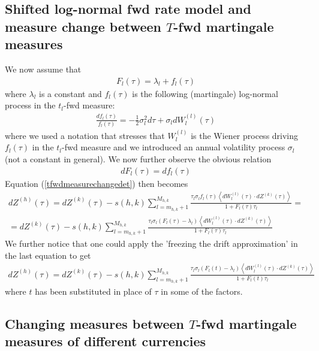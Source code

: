 \documentclass[a4paper,10pt]{report}
\theoremstyle{plain}
\theoremstyle{definition}
\newcommand\be{\begin{eqnarray}}    %
\newcommand\ee{\end{eqnarray}}
\begin{document}
\subsection{Shifted log-normal fwd rate model and measure change between $T$-fwd martingale measures}

We now assume that
\be 
F_l(\tau) = \lambda_l + f_l(\tau)
\ee
where $\lambda_l$ is a constant and $f_l(\tau)$ is the following (martingale) log-normal process in the $t_l$-fwd measure:
\be 
\frac{d f_l(\tau)}{f_l(\tau)} = -\frac{1}{2}\sigma_l^2 d\tau + \sigma_l dW_l^{(l)}(\tau)
\ee
where we used a notation that stresses that $W_l^{(l)}$ is the Wiener process driving $f_l(\tau)$ in the $t_l$-fwd measure and we introduced an annual volatility process $\sigma_l$ (not a constant in general).
We now further observe the obvious relation 
\be 
d F_l(\tau) = d f_l(\tau)
\ee
Equation (\ref{tfwdmeasurechangedet}) then becomes
\be 
dZ^{(h)}(\tau) = dZ^{(k)}(\tau)- s(h,k) \sum_{l=m_{h,k}+1}^{M_{h,k}} \frac{\tau_l \sigma_l f_l(\tau) \left<d W_l^{(l)}(\tau)\cdot dZ^{(k)}(\tau)\right>}{1 + F_l(\tau)\tau_l } =\\
= dZ^{(k)}(\tau)- s(h,k) \sum_{l=m_{h,k}+1}^{M_{h,k}} \frac{\tau_l \sigma_l (F_l(\tau)-\lambda_l) \left<d W_l^{(l)}(\tau)\cdot dZ^{(k)}(\tau)\right>}{1 + F_l(\tau)\tau_l }
\label{shifttfwdmeasurechange}
\ee
We further notice that one could apply the 'freezing the drift approximation' in the last equation to get
\be 
dZ^{(h)}(\tau) =dZ^{(k)}(\tau)- s(h,k) \sum_{l=m_{h,k}+1}^{M_{h,k}} \frac{\tau_l \sigma_l (F_l(t)-\lambda_l) \left<d W_l^{(l)}(\tau)\cdot dZ^{(k)}(\tau)\right>}{1 + F_l(t)\tau_l }
\ee
where $t$ has been substituted in place of $\tau$ in some of the factors.

\subsection{Changing measures between $T$-fwd martingale measures of different currencies}
\end{document}
